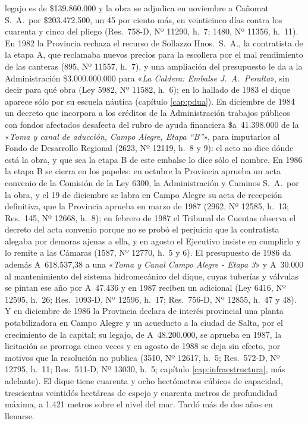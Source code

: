 legajo es de \$139.860.000 y la obra se adjudica en noviembre a Cañomat S.\ A.\ por \$203.472.500, un 45 por ciento más, en veinticinco días contra los cuarenta y cinco del pliego (Res.\ 758-D, Nº 11290, h.\ 7; 1480, Nº 11356, h.\ 11). En 1982 la Provincia rechaza el recurso de Sollazzo Hnos.\ S.\ A., la contratista de la etapa A, que reclamaba nuevos precios para la escollera por el mal rendimiento de las canteras (895, Nº 11557, h.\ 7), y una ampliación del presupuesto le da a la Administración \$3.000.000.000 para «\textit{La Caldera: Embalse J.\ A.\ Peralta}», sin decir para qué obra (Ley 5982, Nº 11582, h.\ 6); en lo hallado de 1983 el dique aparece sólo por su escuela náutica (capítulo \ref{cap:pdua}). En diciembre de 1984 un decreto que incorpora a los créditos de la Administración trabajos públicos con fondos afectados desafecta del rubro de ayuda financiera \$a~41.398.000 de la «\textit{Toma y canal de aducción, Campo Alegre, Etapa ``B''}», para imputarlos al Fondo de Desarrollo Regional (2623, Nº 12119, h.\ 8 y 9): el acto no dice dónde está la obra, y que sea la etapa B de este embalse lo dice sólo el nombre. En 1986 la etapa B se cierra en los papeles: en octubre la Provincia aprueba un acta convenio de la Comisión de la Ley 6300, la Administración y Caminos S.\ A.\ por la obra, y el 19 de diciembre se labra en Campo Alegre su acta de recepción definitiva, que la Provincia aprueba en marzo de 1987 (2962, Nº 12585, h.\ 13; Res.\ 145, Nº 12668, h.\ 8); en febrero de 1987 el Tribunal de Cuentas observa el decreto del acta convenio porque no se probó el perjuicio que la contratista alegaba por demoras ajenas a ella, y en agosto el Ejecutivo insiste en cumplirlo y lo remite a las Cámaras (1587, Nº 12770, h.\ 5 y 6). El presupuesto de 1986 da además A~618.537,38 a una «\textit{Toma y Canal Campo Alegre - Etapa 3}» y A~30.000 al mantenimiento del sistema hidromecánico del dique, cuyas tuberías y válvulas se pintan ese año por A~47.436 y en 1987 reciben un adicional (Ley 6416, Nº 12595, h.\ 26; Res.\ 1093-D, Nº 12596, h.\ 17; Res.\ 756-D, Nº 12855, h.\ 47 y 48). Y en diciembre de 1986 la Provincia declara de interés provincial una planta potabilizadora en Campo Alegre y un acueducto a la ciudad de Salta, por el crecimiento de la capital; su legajo, de A~48.200.000, se aprueba en 1987, la licitación se prorroga cinco veces y en agosto de 1988 se deja sin efecto, por motivos que la resolución no publica (3510, Nº 12617, h.\ 5; Res.\ 572-D, Nº 12795, h.\ 11; Res.\ 511-D, Nº 13030, h.\ 5; capítulo \ref{cap:infraestructura}, más adelante). El dique tiene cuarenta y ocho hectómetros cúbicos de capacidad, trescientas veintidós hectáreas de espejo y cuarenta metros de profundidad máxima, a 1.421 metros sobre el nivel del mar. Tardó más de dos años en llenarse.

